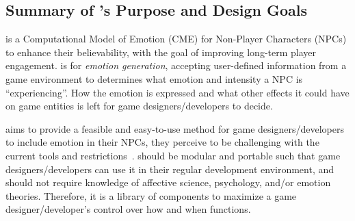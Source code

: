 \subsection{Summary of \progname{}'s Purpose and Design Goals}
\progname{} is a Computational Model of Emotion (CME) for Non-Player Characters
(NPCs) to enhance their believability, with the goal of improving long-term
player engagement. \progname{} is for \textit{emotion generation}, accepting
user-defined information from a game environment to determines what emotion and
intensity a NPC is ``experiencing''. How the emotion is expressed and what
other effects it could have on game entities is left for game
designers/developers to decide.

\progname{} aims to provide a feasible and easy-to-use method for game
designers/developers to include emotion in their NPCs, they perceive to be
challenging with the current tools and
restrictions~\citep{broekens2016emotional}. \progname{} should be modular and
portable such that game designers/developers can use it in their regular
development environment, and should not require knowledge of affective science,
psychology, and/or emotion theories. Therefore, it is a library of components
to maximize a game designer/developer's control over how and when \progname{}
functions.